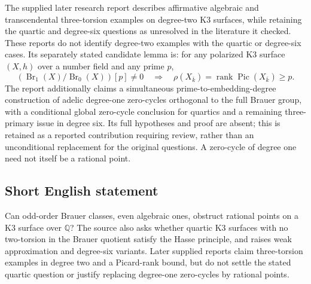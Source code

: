\documentclass[11pt]{article}
\newcommand{\Q}{\mathbb{Q}}
\begin{document}
The supplied later research report describes affirmative algebraic and transcendental three-torsion examples on degree-two K3 surfaces, while retaining the quartic and degree-six questions as unresolved in the literature it checked. These reports do not identify degree-two examples with the quartic or degree-six cases. Its separately stated candidate lemma is: for any polarized K3 surface \((X,h)\) over a number field and any prime \(p\),
\[
 (\operatorname{Br}_1(X)/\operatorname{Br}_0(X))[p]\ne0
 \quad\Longrightarrow\quad
 \rho(X_{\bar k})=\operatorname{rank}\operatorname{Pic}(X_{\bar k})\ge p.
\]
The report additionally claims a simultaneous prime-to-embedding-degree construction of adelic degree-one zero-cycles orthogonal to the full Brauer group, with a conditional global zero-cycle conclusion for quartics and a remaining three-primary issue in degree six. Its full hypotheses and proof are absent; this is retained as a reported contribution requiring review, rather than an unconditional replacement for the original questions. A zero-cycle of degree one need not itself be a rational point.
\subsection{Short English statement}
Can odd-order Brauer classes, even algebraic ones, obstruct rational points on a K3 surface over \(\Q\)? The source also asks whether quartic K3 surfaces with no two-torsion in the Brauer quotient satisfy the Hasse principle, and raises weak approximation and degree-six variants. Later supplied reports claim three-torsion examples in degree two and a Picard-rank bound, but do not settle the stated quartic question or justify replacing degree-one zero-cycles by rational points.
\end{document}

